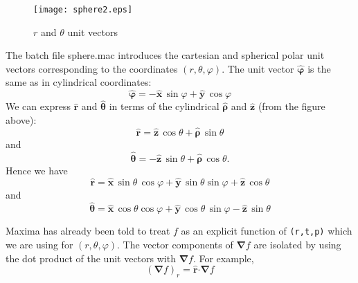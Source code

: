 \documentclass[12pt]{article}
\begin{document}
\begin{figure} [h]
   \centerline{\texttt{[image: sphere2.eps]} }
	\caption{ $r$ and $\theta$ unit vectors   }
\end{figure}   

\smallskip
The batch file sphere.mac introduces the cartesian and spherical polar unit vectors
  corresponding to the coordinates $(r,\theta,\varphi)$.
The unit vector $\boldsymbol{\hat{\varphi}}$ is the same as in cylindrical coordinates:
\begin{equation}  
  \boldsymbol{\hat{\varphi}} = -\mathbf{\hat{x}} \,\sin \varphi +   \mathbf{\hat{y}} \,\cos \varphi
\end{equation}  
We can express $\mathbf{\hat{r}}$ and $\boldsymbol{\hat{\theta}}$ in terms of the
  cylindrical $\boldsymbol{\hat{\rho}}$ and $\mathbf{\hat{z}}$ (from the figure above):
\begin{equation}
 \mathbf{\hat{r}} = \mathbf{\hat{z}} \, \cos \theta +  \boldsymbol{\hat{\rho}} \, \sin \theta
\end{equation}  
and
\begin{equation}
\boldsymbol{\hat{\theta}} = - \mathbf{\hat{z}} \, \sin \theta +  \boldsymbol{\hat{\rho}} \, \cos \theta.
\end{equation}
Hence we have
\begin{equation}  
  \mathbf{\hat{r}} = \mathbf{\hat{x}}\, \sin \theta \, \cos \varphi + 
  \mathbf{\hat{y}}\, \sin \theta \sin \varphi + \mathbf{\hat{z}} \, \cos \theta
\end{equation}
and
\begin{equation}  
  \boldsymbol{\hat{\theta}} = \mathbf{\hat{x}} \, \cos \theta \cos \varphi +
   \mathbf{\hat{y}} \, \cos \theta \,\sin \varphi - \mathbf{\hat{z}} \, \sin \theta
\end{equation}  


Maxima has already been told to treat $f$ as an explicit function of \verb|(r,t,p)| which we are
  using for $(r,\theta,\varphi)$.
\newpage
The vector components of $\boldsymbol{\nabla} f$ are isolated by using the dot product of
  the unit vectors with $\boldsymbol{\nabla} f$.
For example,
\begin{equation}
 \left( \boldsymbol{\nabla} f \right)_{r} = \mathbf{\hat{r}} \boldsymbol{\cdot} \boldsymbol{\nabla} f
\end{equation}  
\end{document}
